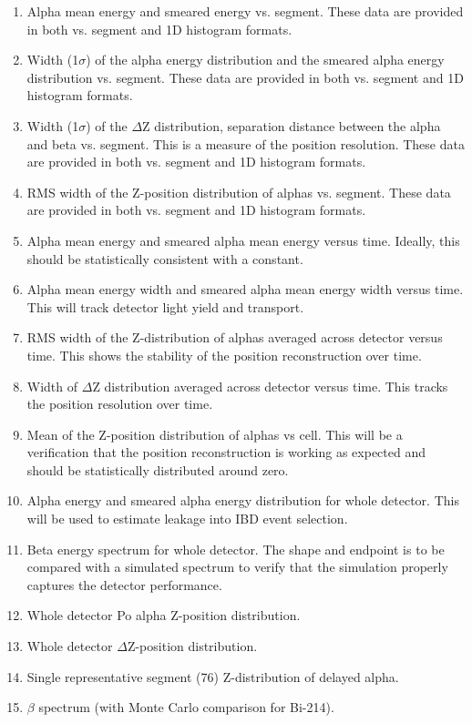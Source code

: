 \begin{enumerate}
\item{Alpha mean energy and smeared energy vs. segment. These data are provided in both vs. segment and 1D histogram formats.}
\item{Width (1$\sigma$) of the alpha energy distribution and the smeared alpha energy distribution vs. segment. These data are provided in both vs. segment and 1D histogram formats.}
\item{Width (1$\sigma$) of the $\Delta$Z distribution, separation distance between the alpha and beta vs. segment. This is a measure of the position resolution. These data are provided in both vs. segment and 1D histogram formats.}
\item{RMS width of the Z-position distribution of alphas vs. segment. These data are provided in both vs. segment and 1D histogram formats.}
\item{Alpha mean energy and smeared alpha mean energy versus time. Ideally, this should be statistically consistent with a constant.}
\item{Alpha mean energy width and smeared alpha mean energy width versus time. This will track detector light yield and transport.}
\item{RMS width of the Z-distribution of alphas averaged across detector versus time. This shows the stability of the position reconstruction over time.}
\item{Width of $\Delta$Z distribution averaged across detector versus time. This tracks the position resolution over time.}
\item{Mean of the Z-position distribution of alphas vs cell. This will be a verification that the position reconstruction is working as expected and should be statistically distributed around zero.}
\item{Alpha energy and smeared alpha energy distribution for whole detector. This will be used to estimate leakage into IBD event selection.}
\item{Beta energy spectrum for whole detector. The shape and endpoint is to be compared with a simulated spectrum to verify that the simulation properly captures the detector performance. }
\item{Whole detector Po alpha Z-position distribution.}
\item{Whole detector $\Delta$Z-position distribution.}
\item {Single representative segment (76) Z-distribution of delayed alpha.}
\item {$\beta$ spectrum (with Monte Carlo comparison for Bi-214).}
\end{enumerate}
